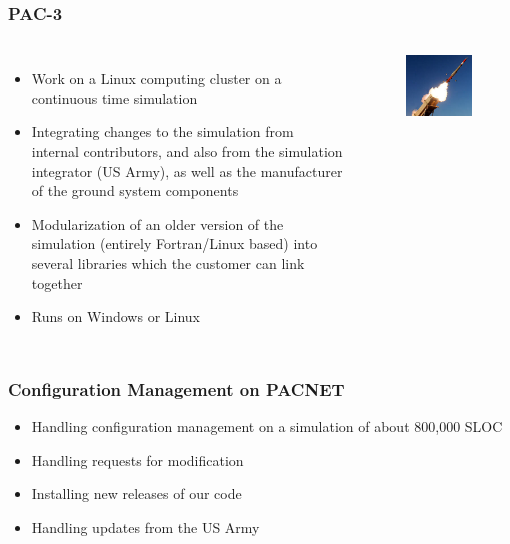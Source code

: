 \documentclass[aspectratio=169]{beamer}
\begin{document}
\begin{frame}
  \frametitle{PAC-3} %
  \begin{columns}[t]
  \begin{itemize}
  \item Work on a Linux computing cluster on a continuous time
    simulation
  \item Integrating changes to the simulation from internal
    contributors, and also from the simulation integrator (US Army),
    as well as the manufacturer of the ground system components
  \item Modularization of an older version of the simulation (entirely
    Fortran/Linux based) into several libraries which the customer can
    link together
  \item Runs on Windows or Linux
  \end{itemize}

  \begin{figure}
    \includegraphics[width=\textwidth]{PAC-3.jpeg}
  \end{figure}
  \end{columns}
\end{frame}

\begin{frame}
  \frametitle{Configuration Management on PACNET}
  \begin{itemize}
  \item Handling configuration management on a simulation of about
    800,000 SLOC
  \item Handling requests for modification
  \item Installing new releases of our code
  \item Handling updates from the US Army
  \end{itemize}
\end{frame}
\end{document}
